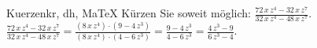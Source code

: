 \begin{MAufgabe}{Kuerzen}{kr, dh, MaTeX}
K\"urzen Sie soweit m\"oglich: $\frac{72\, x\, z^4 - 32\, x\, z^7}{32\, x\, z^4 - 48\, x\, z^7}$.\\ 
\ifLsg\MLoesung
\quad $\frac{72\, x\, z^4 - 32\, x\, z^7}{32\, x\, z^4 - 48\, x\, z^7}=\frac{(8\, x\, z^4)\cdot(9 - 4\, z^3)}{(8\, x\, z^4)\cdot(4 - 6\, z^3)}=\frac{9 - 4\, z^3}{4 - 6\, z^3}=\frac{4\, z^3 - 9}{6\, z^3 - 4}$.\else\relax\fi
 \end{MAufgabe}